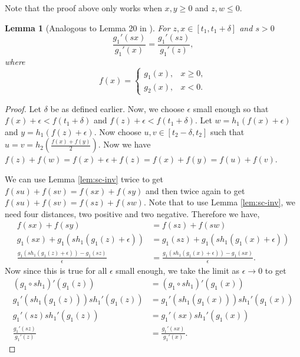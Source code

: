 \documentclass{article}
\newtheorem{lemma}{Lemma}
\begin{document}
  Note that the proof above only works when $x,y\geq 0$ and $z,w\leq
  0$.

  \begin{lemma}[Analogous to Lemma 20 in \cite{minimal}]\label{lem:t1delta}
    For $z,x\in[t_1,t_1+\delta]$ and $s>0$ \[\frac{g_1'(sx)}{g_1'(x)} =
      \frac{g_1'(sz)}{g_1'(z)} ,\] where
    \[
      f(x) =
      \begin{cases}
        g_1(x), & x\geq 0, \\
        g_2(x), & x<0.
      \end{cases}
    \]
\end{lemma}

\begin{proof}
Let $\delta$ be as defined earlier.
Now, we choose $\epsilon$ small enough so that $f(x)+\epsilon <
f(t_1+\delta)$ and $f(z)+\epsilon < f(t_1+\delta)$.
Let $w=h_1(f(x)+\epsilon)$ and $y=h_1(f(z)+\epsilon)$.
Now choose $u,v\in[t_2-\delta,t_2]$ such that $u=v=h_2 \left(
  \frac{f(x)+f(y)}{2} \right)$. Now we have
$f(z)+f(w) = f(x)+\epsilon+f(z)=f(x)+f(y) = f(u)+f(v)$.

We can use Lemma \ref{lem:sc-inv} twice  to get $f(su)+f(sv) =
f(sx)+f(sy)$ and then twice again to get $f(su)+f(sv) = f(sz)+f(sw)$.
Note that to use Lemma \ref{lem:sc-inv}, we need four distances, two
positive and two negative.
Therefore we have,
\begin{align*}
  f(sx)+ f(sy) &= f(sz)+f(sw)\\
  g_1(sx)+g_1(sh_1(g_1(z) +\epsilon)) & =
                                        g_1(sz)+g_1(sh_1(g_1(x)+\epsilon)) \\
  \frac{g_1(sh_1(g_1(z) +\epsilon)) - g_1(sz)}{\epsilon} &
  =\frac{g_1(sh_1(g_1(x)+\epsilon)) - g_1(sx) }{\epsilon}.
\end{align*}
Now since this is true for all $\epsilon$ small enough, we take the
limit as $\epsilon\rightarrow 0$ to get
\begin{align*}
  (g_1 \circ sh_1)'(g_1(z)) & =  (g_1 \circ sh_1)'(g_1(x)) \\
  g_1'(sh_1(g_1(z))) sh_1'(g_1(z)) & = g_1'(sh_1(g_1(x)))
                                     sh_1'(g_1(x)) \\
  g_1'(sz) s h_1'(g_1(z)) & = g_1'(sx) s h_1'(g_1(x))\\
  \frac{g_1'(sz)}{g_1'(z)} &= \frac{g_1'(sx)}{g_1'(x)}.
\end{align*}
\end{proof}
\end{document}
